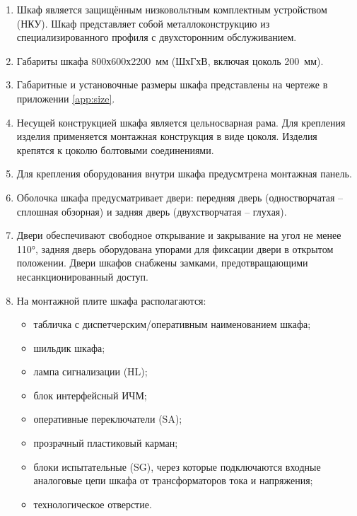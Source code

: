\begin{enumerate}[label=\arabic{section}.\arabic{subsection}.\arabic{subsubsection}.\arabic*, align=left, labelsep=4pt, leftmargin=0pt, itemindent=2cm]

\item
Шкаф является защищённым низковольтным комплектным устройством (НКУ).
Шкаф представляет собой металлоконструкцию из специализированного профиля с двухсторонним обслуживанием.

\item
Габариты шкафа 800х600х2200~мм (ШхГхВ, включая цоколь 200~мм).

\item
Габаритные и установочные размеры шкафа представлены на чертеже в приложении \ref{app:size}.

\item
Несущей конструкцией шкафа является цельносварная рама.
Для крепления изделия применяется монтажная конструкция в виде цоколя.
Изделия крепятся к цоколю болтовыми соединениями.

\item
Для крепления оборудования внутри шкафа предусмтрена монтажная панель.

\item
Оболочка шкафа предусматривает двери: передняя дверь (одностворчатая -- сплошная обзорная) и задняя дверь (двухстворчатая -- глухая).

\item
Двери обеспечивают свободное открывание и закрывание на угол не менее 110°, задняя дверь оборудована упорами для фиксации двери в открытом положении.
Двери шкафов снабжены замками, предотвращающими несанкционированный доступ.

\item
На монтажной плите шкафа располагаются:
\begin{itemize}
\item табличка с диспетчерским/оперативным наименованием шкафа;
\item шильдик шкафа;
\item лампа сигнализации (HL);
\item блок интерфейсный ИЧМ;
\item оперативные переключатели (SA);
\item прозрачный пластиковый карман;
\item блоки испытательные (SG), через которые подключаются входные аналоговые цепи шкафа от трансформаторов тока и напряжения;
\item технологическое отверстие.
\end{itemize}


\end{enumerate}
